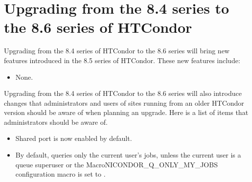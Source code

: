 \section{\label{sec:to-8.6}Upgrading from the 8.4 series to the 8.6 series of HTCondor}

Upgrading from the 8.4 series of HTCondor to the 8.6 series
will bring new features introduced in the 8.5 series of HTCondor.
These new features include:
\begin{itemize}

\item None.

\end{itemize}

Upgrading from the 8.4 series of HTCondor to the 8.6 series will
also introduce changes that administrators and users of sites running from an older
HTCondor version should be aware of when planning an upgrade.
Here is a list of items that administrators should be aware of.

\begin{itemize}

\item Shared port is now enabled by default.

\item By default,  queries only the current user's jobs,
unless the current user is a queue superuser or the
MacroNI{CONDOR\_Q\_ONLY\_MY\_JOBS} configuration macro is set to
.


\end{itemize}

